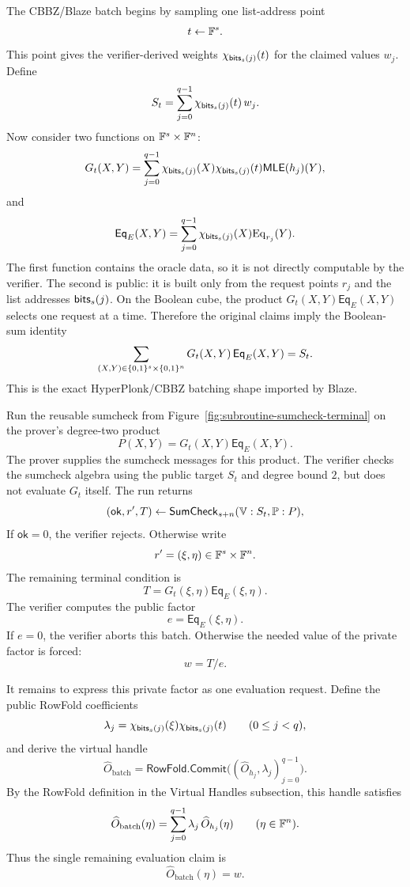 The CBBZ/Blaze batch begins by sampling one list-address point
\[
  t\leftarrow\mathbb{F}^s.
\]
This point gives the verifier-derived weights \(\chi_{\mathsf{bits}_s(j)}(t)\) for the
claimed values \(w_j\).  Define
\[
  S_t
  =
  \sum_{j=0}^{q-1}\chi_{\mathsf{bits}_s(j)}(t)\,w_j .
\]
Now consider two functions on \(\mathbb{F}^s\times\mathbb{F}^n\):
\[
  G_t(X,Y)
  =
  \sum_{j=0}^{q-1}
    \chi_{\mathsf{bits}_s(j)}(X)\chi_{\mathsf{bits}_s(j)}(t)\mathsf{MLE}(h_j)(Y),
\]
and
\[
  \mathsf{Eq}_E(X,Y)
  =
  \sum_{j=0}^{q-1}
    \chi_{\mathsf{bits}_s(j)}(X)\mathrm{Eq}_{r_j}(Y).
\]
The first function contains the oracle data, so it is not directly computable
by the verifier.  The second is public: it is built only from the request
points \(r_j\) and the list addresses \(\mathsf{bits}_s(j)\).  On the Boolean cube, the
product
\(G_t(X,Y)\mathsf{Eq}_E(X,Y)\) selects one request at a time.  Therefore the
original claims imply the Boolean-sum identity
\[
  \sum_{(X,Y)\in\{0,1\}^s\times\{0,1\}^n}
    G_t(X,Y)\,\mathsf{Eq}_E(X,Y)
  =
  S_t .
\]
This is the exact HyperPlonk/CBBZ batching shape imported by Blaze.

Run the reusable sumcheck from Figure~\ref{fig:subroutine-sumcheck-terminal} on
the prover's degree-two product
\[
  P(X,Y)=G_t(X,Y)\mathsf{Eq}_E(X,Y).
\]
The prover supplies the sumcheck messages for this product.  The verifier checks
the sumcheck algebra using the public target \(S_t\) and degree bound \(2\), but
does not evaluate \(G_t\) itself.  The run returns
\[
  (\mathsf{ok},r',T)
  \gets
  \mathsf{SumCheck}_{s+n}(\mathbb{V}:S_t,\mathbb{P}:P),
\]
If
\(\mathsf{ok}=0\), the verifier rejects.  Otherwise write
\[
  r'
  =
  (\xi,\eta)
  \in\mathbb{F}^s\times\mathbb{F}^n.
\]
The remaining terminal condition is
\[
  T
  =
  G_t(\xi,\eta)
  \mathsf{Eq}_E(\xi,\eta).
\]
The verifier computes the public factor
\[
  e
  =
  \mathsf{Eq}_E(\xi,\eta).
\]
If \(e=0\), the verifier aborts this batch.  Otherwise the
needed value of the private factor is forced:
\[
  w
  =
  T/e.
\]

It remains to express this private factor as one evaluation request.  Define
the public RowFold coefficients
\[
  \lambda_j
  =
  \chi_{\mathsf{bits}_s(j)}(\xi)
  \chi_{\mathsf{bits}_s(j)}(t)
  \qquad(0\le j<q),
\]
and derive the virtual handle
\[
  \widehat O_{\mathrm{batch}}
  =
  \mathsf{RowFold.Commit}
  \bigl((\widehat O_{h_j},\lambda_j)_{j=0}^{q-1}\bigr).
\]
By the RowFold definition in the Virtual Handles subsection, this handle
satisfies
\[
  \widehat O_{\mathrm{batch}}(\eta)
  =
  \sum_{j=0}^{q-1}
    \lambda_j\,\widehat O_{h_j}(\eta)
  \qquad(\eta\in\mathbb{F}^n).
\]
Thus the single remaining evaluation claim is
\[
  \widehat O_{\mathrm{batch}}(\eta)
  =
  w.
\]

